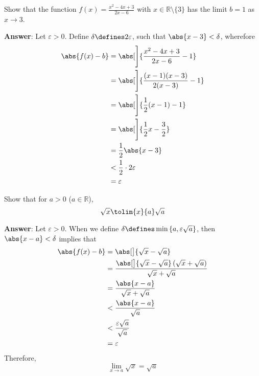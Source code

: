 \begin{exm}\label{exm-epsilon-delta-definition-limit:4}
    Show that the function $f(x)=\tfrac{x^2-4x+3}{2x-6}$ with $x\in\mathbb{R}\setminus\{3\}$
    has the limit $b=1$ as $x\to3$.
    \begin{flushleft}
        \textbf{Answer}: Let $\varepsilon>0$. Define $\delta\defines2\varepsilon$,
        such that $\abs{x-3}<\delta$, wherefore
        \begin{align*}
            \abs{f(x)-b}&=\abs[\Bigg]{\frac{x^2-4x+3}{2x-6}-1}\\
                        &=\abs[\Bigg]{\frac{(x-1)(x-3)}{2(x-3)}-1}\\
                        &=\abs[\Bigg]{\frac{1}{2}(x-1)-1}\\
                        &=\abs[\Bigg]{\frac{1}{2}x-\frac{3}{2}}\\
                        &=\frac{1}{2}\abs{x-3}\\
                        &<\frac{1}{2}\cdot2\varepsilon\\
                        &=\varepsilon
        \end{align*}
    \end{flushleft}
\end{exm}

\begin{exm}\label{exm-epsilon-delta-definition-limit:5}
    Show that for $a>0$ ($a\in\mathbb{R}$),
    \begin{equation*}
        \sqrt{x}\tolim{x}{a}\sqrt{a}
    \end{equation*}
    \begin{flushleft}
        \textbf{Answer}: Let $\varepsilon>0$. When we define $\delta\defines\min\left\{a,\varepsilon\sqrt{a}\right\}$,
        then $\abs{x-a}<\delta$ implies that
        \begin{align*}
            \abs{f(x)-b}&=\abs[\big]{\sqrt{x}-\sqrt{a}}\\
                        &=\frac{\abs[\big]{\sqrt{x}-\sqrt{a}}\left(\sqrt{x}+\sqrt{a}\right)}{\sqrt{x}+\sqrt{a}}\\
                        &=\frac{\abs{x-a}}{\sqrt{x}+\sqrt{a}}\\
                        &<\frac{\abs{x-a}}{\sqrt{a}}\\
                        &<\frac{\varepsilon\sqrt{a}}{\sqrt{a}}\\
                        &=\varepsilon
        \end{align*}
        Therefore,
        \begin{equation*}
            \lim_{x\to a}\sqrt{x}=\sqrt{a}
        \end{equation*}
    \end{flushleft}
\end{exm}

